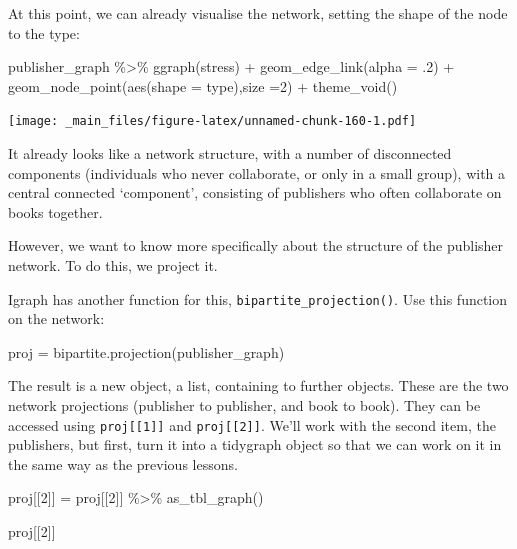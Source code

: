 \documentclass[
]{book}
\newenvironment{Shaded}{\begin{snugshade}}{\end{snugshade}}
\newcommand{\AttributeTok}[1]{\textcolor[rgb]{0.77,0.63,0.00}{#1}}
\newcommand{\DecValTok}[1]{\textcolor[rgb]{0.00,0.00,0.81}{#1}}
\newcommand{\FunctionTok}[1]{\textcolor[rgb]{0.00,0.00,0.00}{#1}}
\newcommand{\NormalTok}[1]{#1}
\newcommand{\OtherTok}[1]{\textcolor[rgb]{0.56,0.35,0.01}{#1}}
\newcommand{\SpecialCharTok}[1]{\textcolor[rgb]{0.00,0.00,0.00}{#1}}
\newcommand{\StringTok}[1]{\textcolor[rgb]{0.31,0.60,0.02}{#1}}
\begin{document}
At this point, we can already visualise the network, setting the shape of the node to the type:

\begin{Shaded}
\begin{Highlighting}[]
\NormalTok{publisher\_graph }\SpecialCharTok{\%\textgreater{}\%} 
  \FunctionTok{ggraph}\NormalTok{(}\StringTok{\textquotesingle{}stress\textquotesingle{}}\NormalTok{) }\SpecialCharTok{+}
  \FunctionTok{geom\_edge\_link}\NormalTok{(}\AttributeTok{alpha =}\NormalTok{ .}\DecValTok{2}\NormalTok{) }\SpecialCharTok{+} 
  \FunctionTok{geom\_node\_point}\NormalTok{(}\FunctionTok{aes}\NormalTok{(}\AttributeTok{shape =}\NormalTok{ type),}\AttributeTok{size =}\DecValTok{2}\NormalTok{) }\SpecialCharTok{+} 
  \FunctionTok{theme\_void}\NormalTok{()}
\end{Highlighting}
\end{Shaded}

\texttt{[image: \_main\_files/figure-latex/unnamed-chunk-160-1.pdf]}

It already looks like a network structure, with a number of disconnected components (individuals who never collaborate, or only in a small group), with a central connected `component', consisting of publishers who often collaborate on books together.

However, we want to know more specifically about the structure of the publisher network. To do this, we project it.

Igraph has another function for this, \texttt{bipartite\_projection()}. Use this function on the network:

\begin{Shaded}
\begin{Highlighting}[]
\NormalTok{proj }\OtherTok{=} \FunctionTok{bipartite.projection}\NormalTok{(publisher\_graph)}
\end{Highlighting}
\end{Shaded}

The result is a new object, a list, containing to further objects. These are the two network projections (publisher to publisher, and book to book). They can be accessed using \texttt{proj{[}{[}1{]}{]}} and \texttt{proj{[}{[}2{]}{]}}. We'll work with the second item, the publishers, but first, turn it into a tidygraph object so that we can work on it in the same way as the previous lessons.

\begin{Shaded}
\begin{Highlighting}[]
\NormalTok{proj[[}\DecValTok{2}\NormalTok{]] }\OtherTok{=}\NormalTok{ proj[[}\DecValTok{2}\NormalTok{]] }\SpecialCharTok{\%\textgreater{}\%} \FunctionTok{as\_tbl\_graph}\NormalTok{()}

\NormalTok{proj[[}\DecValTok{2}\NormalTok{]] }
\end{Highlighting}
\end{Shaded}
\end{document}
